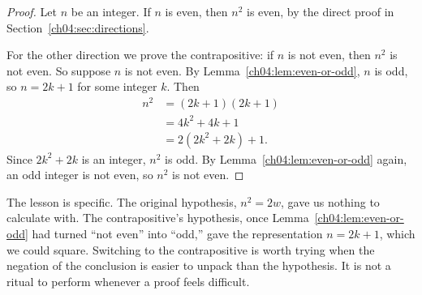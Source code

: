 \begin{proof}
Let $n$ be an integer. If $n$ is even, then $n^2$ is even, by the direct proof in Section~\ref{ch04:sec:directions}.

For the other direction we prove the contrapositive: if $n$ is not even, then $n^2$ is not even. So suppose $n$ is not even. By Lemma~\ref{ch04:lem:even-or-odd}, $n$ is odd, so $n=2k+1$ for some integer $k$. Then
\begin{align*}
n^2&=(2k+1)(2k+1)\\
&=4k^2+4k+1\\
&=2(2k^2+2k)+1.
\end{align*}
Since $2k^2+2k$ is an integer, $n^2$ is odd. By Lemma~\ref{ch04:lem:even-or-odd} again, an odd integer is not even, so $n^2$ is not even.
\end{proof}

The lesson is specific. The original hypothesis, $n^2=2w$, gave us nothing to calculate with. The contrapositive's hypothesis, once Lemma~\ref{ch04:lem:even-or-odd} had turned ``not even'' into ``odd,'' gave the representation $n=2k+1$, which we could square. Switching to the contrapositive is worth trying when the negation of the conclusion is easier to unpack than the hypothesis. It is not a ritual to perform whenever a proof feels difficult.

